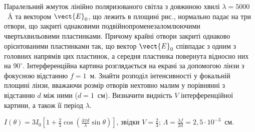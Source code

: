 \begin{problem}%
    Паралельний жмуток лінійно поляризованого світла з довжиною хвилі $ \lambda = 5000 $~\AA{} та вектором $ \vect{E}_0 $, що лежить в площині рис., нормально падає на три отвори, що закриті однаковими подвійнопроменезаломлюючими чвертьхвильовими пластинками. Причому крайні отвори закриті однаково орієнтованими пластинками так, що вектор $ \vect{E}_0 $ співпадає з одним з головних напрямів цих пластинок, а середня пластинка повернута відносно них на $ 90^\circ $. Інтерференційна картина розглядається на екрані за допомогою лінзи з фокусною відстанню $ f = 1 $~м. Знайти розподіл інтенсивності у фокальній площині лінзи, вважаючи розмір отворів нехтовно малим у порівнянні з відстанню $ d $ між ними ($ d = 1 $~см). Визначити видність $ V $ інтерференційної картини, а також її період $ \lambda $.

    \begin{center}
        
    \end{center}
    \begin{solution}
        $ I(\theta) = 3I_0 \left[1 + \frac{2}{3} \cos \left(\frac{4\pi d}{\lambda} \sin\theta\right)\right]  $, звідки $ V = \frac{2}{3} $; $ \Lambda = \frac{\lambda f}{2 d} = 2,5 \cdot 10^{-3} $~см.
    \end{solution}
\end{problem}

